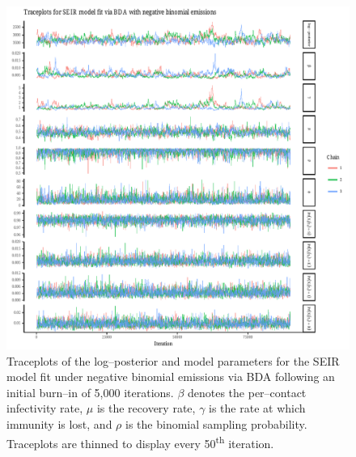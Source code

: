 \begin{figure}[htbp]
	\centering
	\includegraphics[width=\linewidth]{figures/bbs_seir_bda_negbinom_traceplots.pdf}
	\caption[Traceplots of SEIR model parameters fit to boarding school data using Bayesian data augmentation.]{Traceplots of the log--posterior and model parameters for the SEIR model fit under negative binomial emissions via BDA following an initial burn--in of 5,000 iterations. $ \beta $ denotes the per--contact infectivity rate, $ \mu $ is the recovery rate, $ \gamma $ is the rate at which immunity is lost, and $ \rho $ is the binomial sampling probability. Traceplots are thinned to display every 50\textsuperscript{th} iteration.}
	\label{fig:bbs_seir_bda_negbinom_traceplots}
\end{figure}

